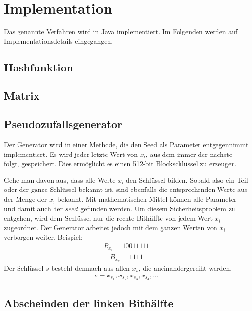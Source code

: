 \documentclass[10pt,a4paper]{article}
\begin{document}
\section{Implementation}

Das genannte Verfahren wird in Java implementiert.
Im Folgenden werden auf Implementationsdetails eingegangen.

\subsection{Hashfunktion}

\subsection{Matrix}

\subsection{Pseudozufallsgenerator}

Der Generator wird in einer Methode, die den Seed als Parameter entgegennimmt implementiert.
Es wird jeder letzte Wert von $x_i$, aus dem immer der nächste folgt, gespeichert.
Dies ermöglicht es einen 512-bit Blockschlüssel zu erzeugen.

Gehe man davon aus, dass alle Werte $x_i$ den Schlüssel bilden. Sobald also ein Teil oder der ganze Schlüssel bekannt ist, sind ebenfalls die entsprechenden Werte aus der Menge der $x_i$ bekannt. Mit mathematischen Mittel können alle Parameter und damit auch der $seed$ gefunden werden.
Um diesem Sicherheitsproblem zu entgehen, wird dem Schlüssel nur die rechte Bithälfte von jedem Wert $x_i$ zugeordnet.
Der Generator arbeitet jedoch mit dem ganzen Werten von $x_i$ verborgen weiter.
Beispiel:
\begin{align*}
    B_{x_i} = 1001 1111
\end{align*}
\begin{align*}
    B_{x_s} = 1111
\end{align*}
Der Schlüssel $s$ besteht demnach aus allen $x_s$, die aneinandergereiht werden.
\begin{align*}
    s = x_{s_1}, x_{s_2}, x_{s_3}, x_{s_4}, ...
\end{align*}

\subsection{Abscheinden der linken Bithälfte}
\end{document}
